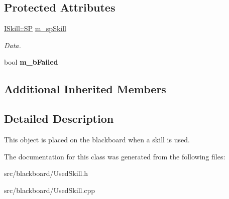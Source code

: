 \subsection*{Protected Attributes}
\begin{DoxyCompactItemize}
\item 
\mbox{\label{class_used_skill_a0e1f8f9921f9da276182d30f5601bc23}} 
\hyperlink{class_i_skill_a68bcce999ab0444eebaca3fb8ddb8a31}{I\+Skill\+::\+SP} \hyperlink{class_used_skill_a0e1f8f9921f9da276182d30f5601bc23}{m\+\_\+sp\+Skill}
\begin{DoxyCompactList}\small\item\em Data. \end{DoxyCompactList}\item 
\mbox{\label{class_used_skill_a31ec924c3a094c2e2961bbbd4fb20677}} 
bool {\bfseries m\+\_\+b\+Failed}
\end{DoxyCompactItemize}
\subsection*{Additional Inherited Members}


\subsection{Detailed Description}
This object is placed on the blackboard when a skill is used. 

The documentation for this class was generated from the following files\+:\begin{DoxyCompactItemize}
\item 
src/blackboard/Used\+Skill.\+h\item 
src/blackboard/Used\+Skill.\+cpp\end{DoxyCompactItemize}
